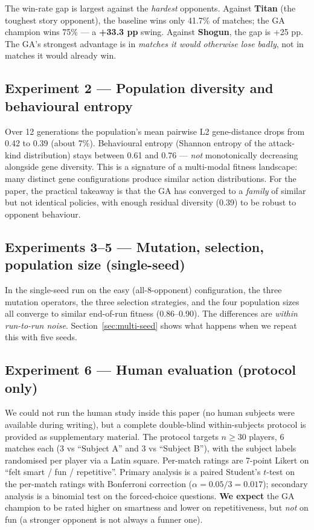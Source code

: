 \documentclass[conference]{IEEEtran}
\begin{document}
The win-rate gap is largest against the \emph{hardest} opponents. Against \textbf{Titan} (the toughest story opponent), the baseline wins only 41.7\% of matches; the GA champion wins 75\% --- a \textbf{+33.3 pp} swing. Against \textbf{Shogun}, the gap is +25 pp. The GA's strongest advantage is in \emph{matches it would otherwise lose badly}, not in matches it would already win.

\subsection{Experiment 2 --- Population diversity and behavioural entropy}

Over 12 generations the population's mean pairwise L2 gene-distance drops from 0.42 to 0.39 (about 7\%). Behavioural entropy (Shannon entropy of the attack-kind distribution) stays between 0.61 and 0.76 --- \emph{not} monotonically decreasing alongside gene diversity. This is a signature of a multi-modal fitness landscape: many distinct gene configurations produce similar action distributions. For the paper, the practical takeaway is that the GA has converged to a \emph{family} of similar but not identical policies, with enough residual diversity (0.39) to be robust to opponent behaviour.

\subsection{Experiments 3--5 --- Mutation, selection, population size (single-seed)}

In the single-seed run on the easy (all-8-opponent) configuration, the three mutation operators, the three selection strategies, and the four population sizes all converge to similar end-of-run fitness (0.86--0.90). The differences are \emph{within run-to-run noise}. Section~\ref{sec:multi-seed} shows what happens when we repeat this with five seeds.

\subsection{Experiment 6 --- Human evaluation (protocol only)}

We could not run the human study inside this paper (no human subjects were available during writing), but a complete double-blind within-subjects protocol is provided as supplementary material. The protocol targets $n \geq 30$ players, 6 matches each (3 vs ``Subject A'' and 3 vs ``Subject B''), with the subject labels randomised per player via a Latin square. Per-match ratings are 7-point Likert on ``felt smart / fun / repetitive''. Primary analysis is a paired Student's $t$-test on the per-match ratings with Bonferroni correction ($\alpha = 0.05/3 = 0.017$); secondary analysis is a binomial test on the forced-choice questions. \textbf{We expect} the GA champion to be rated higher on smartness and lower on repetitiveness, but \emph{not} on fun (a stronger opponent is not always a funner one).
\end{document}
